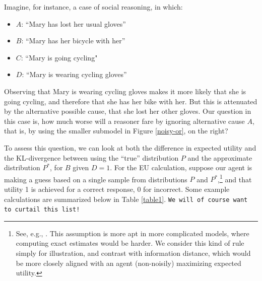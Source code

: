 \documentclass[10pt,letterpaper]{article}
\begin{document}
Imagine, for instance, a case of social reasoning, in which: \begin{itemize} \item[] $A$: ``Mary has lost her usual gloves'' \item[] $B$: ``Mary has her bicycle with her''  \item[] $C$: ``Mary is going cycling"  \item[] $D$:  ``Mary is wearing cycling gloves'' \end{itemize}
Observing that Mary is wearing cycling gloves makes it more likely that she is going cycling, and therefore that she has her bike with her. But this is attenuated by the alternative possible cause, that she lost her other gloves. Our question in this case is, how much worse will a reasoner fare by ignoring alternative cause $A$, that is, by using the smaller submodel  in Figure \ref{noisy-or}, on the right?

To assess this question, we can look at both the difference in expected utility and the KL-divergence between using the ``true'' distribution $P$ and the approximate distribution $P^*$, for $B$ given $D=1$. For the EU calculation, suppose our agent is making a guess based on a single sample from distributions $P$ and $P^*$,\footnote{See, e.g., \citep{Vul2014}. This assumption is more apt in more complicated models, where computing exact estimates would be harder. We consider this kind of rule simply for illustration, and contrast with information distance, which would be more closely aligned with an agent (non-noisily) maximizing expected utility.} 
and that utility 1 is achieved for a correct response, 0 for incorrect. Some example calculations are summarized below in Table \ref{table1}. \texttt{We will of course want to curtail this list!}
\end{document}
